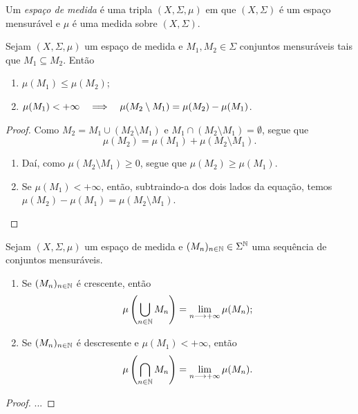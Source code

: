 \begin{defi}
	Um \emph{espaço de medida} é uma tripla $(X,\Sigma,\mu)$ em que $(X,\Sigma)$ é um espaço mensurável e $\mu$ é uma medida sobre $(X,\Sigma)$.
\end{defi}

\begin{prop}
Sejam $(X, \Sigma,\mu)$ um espaço de medida e $M_1,M_2 \in \Sigma$ conjuntos mensuráveis tais que $M_1 \subseteq M_2$. Então
	\begin{enumerate}
	\item $\mu(M_1) \leq \mu(M_2)$;
	\item $\mu(M_1) < + \infty \quad \Longrightarrow \quad \mu(M_2 \setminus M_1) = \mu(M_2) - \mu(M_1)$.
	\end{enumerate}
\end{prop}
\begin{proof}
	Como $M_2 = M_1 \cup (M_2 \setminus M_1)$ e $M_1 \cap (M_2 \setminus M_1) = \emptyset$, segue que
	\begin{equation*}
	\mu(M_2)=\mu(M_1)+\mu(M_2 \setminus M_1).
	\end{equation*}
	\begin{enumerate}
	\item Daí, como $\mu(M_2 \setminus M_1) \geq 0$, segue que $\mu(M_2) \geq \mu(M_1)$.
	\item Se $\mu(M_1) < + \infty$, então, subtraindo-a dos dois lados da equação, temos $\mu(M_2)-\mu(M_1)=\mu(M_2 \setminus M_1)$.
	\end{enumerate}
\end{proof}

\begin{prop}
Sejam $(X, \Sigma,\mu)$ um espaço de medida e $(M_n)_{n \in \mathbb{N}} \in \Sigma^{\mathbb{N}}$ uma sequência de conjuntos mensuráveis.
	\begin{enumerate}
	\item Se $(M_n)_{n \in \mathbb{N}}$ é crescente, então
		\begin{equation*}
		\mu \left( \bigcup_{n \in \mathbb{N}} M_n \right) = \lim_{n \longrightarrow +\infty} \mu(M_n);
		\end{equation*}
	\item Se $(M_n)_{n \in \mathbb{N}}$ é descresente e $\mu(M_1) < + \infty$, então
		\begin{equation*}
		\mu \left( \bigcap_{n \in \mathbb{N}} M_n \right) = \lim_{n \longrightarrow +\infty} \mu(M_n).
		\end{equation*}
	\end{enumerate}
\end{prop}
\begin{proof}
	...
\end{proof}





